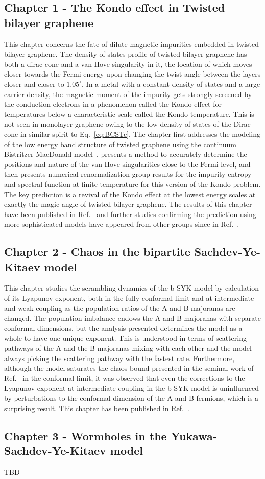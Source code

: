 \subsection{Chapter 1 - The Kondo effect in Twisted bilayer graphene}
This chapter concerns the fate of dilute magnetic impurities embedded in twisted bilayer graphene. The density of states profile of twisted bilayer graphene has both a dirac cone and a van Hove singularity in it, the location of which moves closer towards the Fermi energy upon changing the twist angle between the layers closer and closer to $1.05^\circ$. In a metal with a constant density of states and a large carrier density, the magnetic moment of the impurity gets strongly screened by the conduction electrons in a phenomenon called the Kondo effect for temperatures below a characteristic scale called the Kondo temperature. This is not seen in monolayer graphene owing to the low density of states of the Dirac cone in similar spirit to Eq.~\ref{eq:BCSTc}. The chapter first addresses the modeling of the low energy band structure of twisted graphene using the continuum Bistritzer-MacDonald model~\cite{Bistritzer2011}, presents a method to accurately determine the positions and nature of the van Hove singularities close to the Fermi level, and then presents numerical renormalization group results for the impurity entropy and spectral function at finite temperature for this version of the Kondo problem. The key prediction is a revival of the Kondo effect at the lowest energy scales at exactly the magic angle of twisted bilayer graphene. The results of this chapter have been published in Ref.~\cite{shankar2023kondo} and further studies confirming the prediction using more sophisticated models have appeared from other groups since in Ref.~\cite{chang2023vacancy}. 

\subsection{Chapter 2 - Chaos in the bipartite Sachdev-Ye-Kitaev model}
This chapter studies the scrambling dynamics of the b-SYK model by calculation of its Lyapunov exponent, both in the fully conformal limit and at intermediate and weak coupling as the population ratios of the A and B majoranas are changed. The population imbalance endows the A and B majoranas with separate conformal dimensions, but the analysis presented determines the model as a whole to have one unique exponent. This is understood in terms of scattering pathways of the A and the B majoranas mixing with each other and the model always picking the scattering pathway with the fastest rate. Furthermore, although the model saturates the chaos bound presented in the seminal work of Ref.~\cite{maldacena_bound_2016} in the conformal limit, it was observed that even the corrections to the Lyapunov exponent at intermediate coupling in the b-SYK model is uninfluenced by perturbations to the conformal dimension of the A and B fermions, which is a surprising result. This chapter has been published in Ref.~\cite{shankar2023lyapunov}.


\subsection{Chapter 3 - Wormholes in the Yukawa-Sachdev-Ye-Kitaev model}

TBD